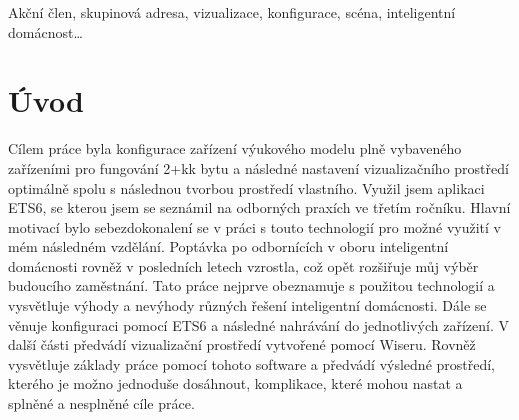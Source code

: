 \documentclass[12pt, a4paper,
twoside,        %
openright
]{report}
\begin{document}
	
	\noindent Akční člen, skupinová adresa, vizualizace, konfigurace, scéna, inteligentní domácnost\dots 
	
	\vspace{18pt}
	
	\clearpage %

	
	\tableofcontents %

	\setcounter{page}{1} %

	\chapter*{Úvod}
Cílem práce byla konfigurace zařízení výukového modelu plně vybaveného zařízeními pro fungování 2+kk bytu a následné nastavení vizualizačního prostředí optimálně spolu s následnou tvorbou prostředí vlastního. Využil jsem aplikaci ETS6, se kterou jsem se seznámil na odborných praxích ve třetím ročníku.
Hlavní motivací bylo sebezdokonalení se v práci s touto technologií pro možné využití v mém následném vzdělání. Poptávka po odbornících v oboru inteligentní domácnosti rovněž v posledních letech vzrostla, což opět rozšiřuje můj výběr budoucího zaměstnání.
Tato práce nejprve obeznamuje s použitou technologií a vysvětluje výhody a nevýhody různých řešení inteligentní domácnosti. Dále se věnuje konfiguraci pomocí ETS6 a následné nahrávání do jednotlivých zařízení.
V další části předvádí vizualizační prostředí vytvořené pomocí Wiseru. Rovněž vysvětluje základy práce pomocí tohoto software a předvádí výsledné prostředí, kterého je možno jednoduše dosáhnout, komplikace, které mohou nastat a splněné a nesplněné cíle práce.
\end{document}
